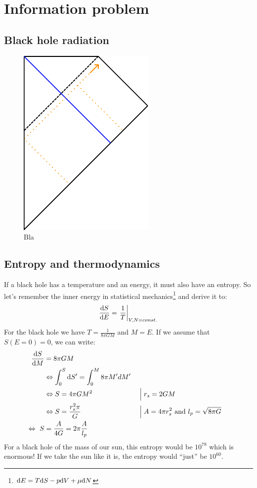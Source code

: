 \section{Information problem}

	\subsection{Black hole radiation} 
	\begin{figure}
		\begin{center}
			\includegraphics[scale=1]{collapse2}
			\caption{Bla} \label{plots_of_V}
		\end{center}
	\end{figure}

	\subsection{Entropy and thermodynamics \checkmark}
	If a black hole has a temperature and an energy, it must also have an entropy. So let's remember the inner energy in statistical mechanics\footnote{$\mathrm{d} E = 
	T \mathrm{d} S - p \mathrm{d} V + \mu \mathrm{d} N$} and derive it to:
		\begin{equation}
			\frac{\mathrm{d} S}{\mathrm{d} E} = \left. \frac{1}{T} \right|_{V,N=const.}
		\end{equation}
	For the black hole we have $T = \frac{1}{8 \pi G M}$ and $M=E$. If we assume that $S(E=0) = 0$, we can write:
		\begin{align}
			\frac{\mathrm{d} S}{\mathrm{d} M} &= 8 \pi G M \nonumber \\
			&\Leftrightarrow \int_0^S \mathrm{d} S' = \int_0^M 8 \pi M' dM' \nonumber\\
			&\Leftrightarrow S = 4 \pi G M^2 & & \Bigm| r_s = 2GM \nonumber\\
			&\Leftrightarrow S = \frac{r_s^2 \pi}{G}  & & \Bigm| A=4 \pi r_s^2 \text{~and~} l_p = \sqrt{8 \pi G} \nonumber\\
			\Leftrightarrow~
			S &= \frac{A}{4G} = 2 \pi \frac{A}{l_p} \label{entropy}
		\end{align}
	For a black hole of the mass of our sun, this entropy would be $10^{78}$ which is enormous! If we take the sun like it is, the entropy would ``just'' be $10^{60}$. 
	
